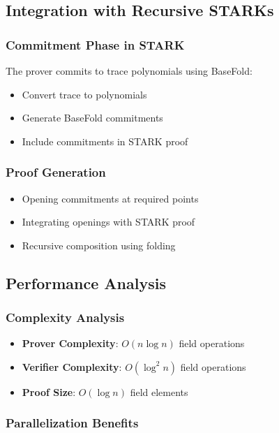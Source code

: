 \documentclass{article}
\theoremstyle{plain}
\theoremstyle{definition}
\theoremstyle{remark}
\theoremstyle{problem}
\begin{document}
\subsection{Integration with Recursive STARKs}

\subsubsection{Commitment Phase in STARK}

The prover commits to trace polynomials using BaseFold:
\begin{itemize}
    \item Convert trace to polynomials
    \item Generate BaseFold commitments
    \item Include commitments in STARK proof
\end{itemize}

\subsubsection{Proof Generation}

\begin{itemize}
    \item Opening commitments at required points
    \item Integrating openings with STARK proof
    \item Recursive composition using folding
\end{itemize}

\subsection{Performance Analysis}

\subsubsection{Complexity Analysis}

\begin{itemize}
    \item \textbf{Prover Complexity}: $O(n \log n)$ field operations
    \item \textbf{Verifier Complexity}: $O(\log^2 n)$ field operations
    \item \textbf{Proof Size}: $O(\log n)$ field elements
\end{itemize}

\subsubsection{Parallelization Benefits}
\end{document}
